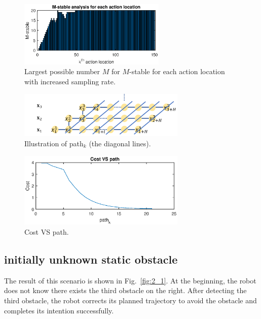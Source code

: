 \documentclass{ifacconf}
\begin{document}
\begin{figure}[t]
\begin{center}
\includegraphics[width=7cm]{plot/1_4.eps}
\caption{Largest possible number $M$ for $M$-stable for each action location with increased sampling rate.}
\label{fig:1_4}
\end{center}
\end{figure}



\begin{figure}[t]
\begin{center}
\includegraphics[width=8cm]{src/1_3_path.png}
\caption{Illustration of path$_k$ (the diagonal lines).}
\label{fig:cost1}
\end{center}
\end{figure}

\begin{figure}[t]
\begin{center}
\includegraphics[width=8cm]{plot/1_3.eps}
\caption{Cost VS path.}
\label{fig:costplot}
\end{center}
\end{figure}

\subsection{initially unknown static obstacle}

The result of this scenario is shown in Fig.~\ref{fig:2_1}. At the beginning, the robot does not know there exists the third obstacle on the right. After detecting the third obstacle, the robot corrects its planned trajectory to avoid the obstacle and completes its intention successfully.
\end{document}
